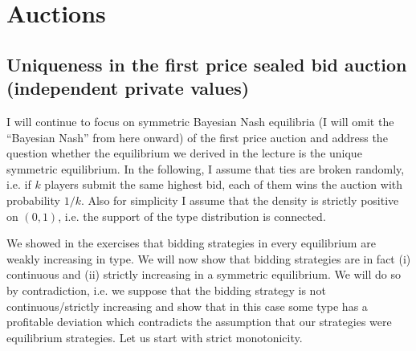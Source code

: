 \documentclass[a4paper,11pt]{article}
\begin{document}
\section{Auctions}
\label{sec:auctions}

\subsection{Uniqueness in the first price sealed bid auction (independent private values)}
\label{sec:uniq-first-price}

I will continue to focus on symmetric Bayesian Nash equilibria (I will omit the ``Bayesian Nash'' from here onward) of the first price auction and address the question whether the equilibrium we derived in the lecture is the unique symmetric equilibrium. In the following, I assume that ties are broken randomly, i.e. if $k$ players submit the same highest bid, each of them wins the auction with probability $1/k$. Also for simplicity I assume that the density is strictly positive on $(0,1)$, i.e. the support of the type distribution is connected. 

We showed in the exercises that bidding strategies in every equilibrium are weakly increasing in type. We will now show  that bidding strategies are in fact (i) continuous and (ii) strictly increasing in a symmetric equilibrium. We will do so by contradiction, i.e. we suppose that the bidding strategy is not continuous/strictly increasing and show that in this case some type has a profitable deviation which contradicts the assumption that our strategies were equilibrium strategies. Let us start with strict monotonicity.
\end{document}
